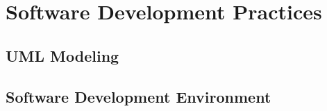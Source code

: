 
\section{Software Development Practices}

\subsection{UML Modeling}

\subsection{Software Development Environment}



